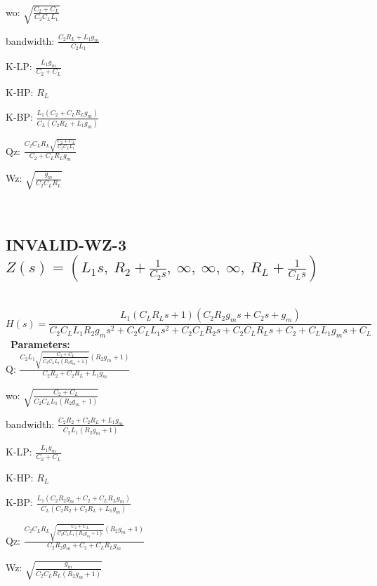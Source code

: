 \documentclass{article}
\begin{document}
wo: $\sqrt{\frac{C_{2} + C_{L}}{C_{2} C_{L} L_{1}}}$\ 

bandwidth: $\frac{C_{2} R_{L} + L_{1} g_{m}}{C_{2} L_{1}}$\ 

K-LP: $\frac{L_{1} g_{m}}{C_{2} + C_{L}}$\ 

K-HP: $R_{L}$\ 

K-BP: $\frac{L_{1} \left(C_{2} + C_{L} R_{L} g_{m}\right)}{C_{L} \left(C_{2} R_{L} + L_{1} g_{m}\right)}$\ 

Qz: $\frac{C_{2} C_{L} R_{L} \sqrt{\frac{C_{2} + C_{L}}{C_{2} C_{L} L_{1}}}}{C_{2} + C_{L} R_{L} g_{m}}$\ 

Wz: $\sqrt{\frac{g_{m}}{C_{2} C_{L} R_{L}}}$\ 

\ 

\subsection{INVALID-WZ-3 $Z(s) = \left( L_{1} s, \  R_{2} + \frac{1}{C_{2} s}, \  \infty, \  \infty, \  \infty, \  R_{L} + \frac{1}{C_{L} s}\right)$ } \ 
\textbf{\[H(s) = \frac{L_{1} \left(C_{L} R_{L} s + 1\right) \left(C_{2} R_{2} g_{m} s + C_{2} s + g_{m}\right)}{C_{2} C_{L} L_{1} R_{2} g_{m} s^{2} + C_{2} C_{L} L_{1} s^{2} + C_{2} C_{L} R_{2} s + C_{2} C_{L} R_{L} s + C_{2} + C_{L} L_{1} g_{m} s + C_{L}}\] } \ 
\textbf{Parameters:}\\ 

Q: $\frac{C_{2} L_{1} \sqrt{\frac{C_{2} + C_{L}}{C_{2} C_{L} L_{1} \left(R_{2} g_{m} + 1\right)}} \left(R_{2} g_{m} + 1\right)}{C_{2} R_{2} + C_{2} R_{L} + L_{1} g_{m}}$\ 

wo: $\sqrt{\frac{C_{2} + C_{L}}{C_{2} C_{L} L_{1} \left(R_{2} g_{m} + 1\right)}}$\ 

bandwidth: $\frac{C_{2} R_{2} + C_{2} R_{L} + L_{1} g_{m}}{C_{2} L_{1} \left(R_{2} g_{m} + 1\right)}$\ 

K-LP: $\frac{L_{1} g_{m}}{C_{2} + C_{L}}$\ 

K-HP: $R_{L}$\ 

K-BP: $\frac{L_{1} \left(C_{2} R_{2} g_{m} + C_{2} + C_{L} R_{L} g_{m}\right)}{C_{L} \left(C_{2} R_{2} + C_{2} R_{L} + L_{1} g_{m}\right)}$\ 

Qz: $\frac{C_{2} C_{L} R_{L} \sqrt{\frac{C_{2} + C_{L}}{C_{2} C_{L} L_{1} \left(R_{2} g_{m} + 1\right)}} \left(R_{2} g_{m} + 1\right)}{C_{2} R_{2} g_{m} + C_{2} + C_{L} R_{L} g_{m}}$\ 

Wz: $\sqrt{\frac{g_{m}}{C_{2} C_{L} R_{L} \left(R_{2} g_{m} + 1\right)}}$\ 
\end{document}
